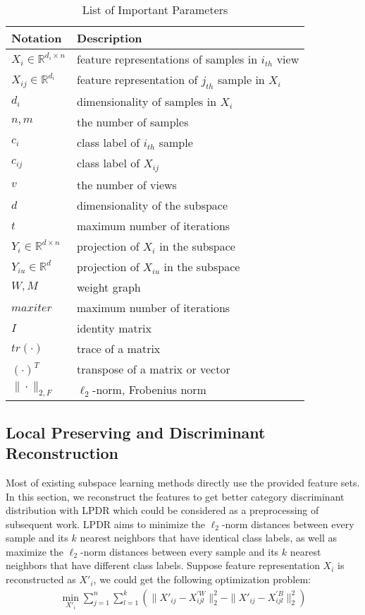 \documentclass[journal]{IEEEtran}
\begin{document}
\begin{table}[!t]
\centering
\caption{List of Important Parameters}
\begin{tabular}{p{2cm}p{6cm}}
\toprule
Notation & \hspace{1.7cm} Description \\
\midrule
$X_i\in \mathbb{R}^{{d_i}\times {n}}$ & feature representations of samples in $i_{th}$ view \\
$X_{ij}\in \mathbb{R}^{d_i}$ & feature representation of $j_{th}$ sample in $X_i$ \\
$d_i$ & dimensionality of samples in $X_i$ \\
$n,m$ & the number of samples \\
$c_i$ & class label of $i_{th}$ sample \\
$c_{ij}$ & class label of $X_{ij}$ \\
$v$ & the number of views \\
$d$ & dimensionality of the subspace \\

$t$ & maximum number of iterations \\
$Y_i\in \mathbb{R}^{d\times n}$ & projection of $X_i$ in the subspace \\
$Y_{iu}\in \mathbb{R}^{d}$ & projection of $X_{iu}$ in the subspace \\

$W, M$ & weight graph \\
$maxiter$ &  maximum number of iterations \\

$I$ & identity matrix \\
$tr(\cdot)$ & trace of a matrix \\
$(\cdot)^T$ & transpose of a matrix or vector \\
$\|\cdot \|_{2, F}$ & $\ell_2$-norm, Frobenius norm \\
\bottomrule
\end{tabular}
\label{notation}
\end{table}


\subsection{Local Preserving and Discriminant Reconstruction}
Most of existing subspace learning methods directly use the provided feature sets. 
In this section, we reconstruct the features to get better category discriminant distribution with LPDR which could be considered as a preprocessing of subsequent work. 
LPDR aims to minimize the $\ell_2$-norm distances between every sample and its $k$ nearest neighbors that have identical class labels, as well as maximize the $\ell_2$-norm distances between every sample and its $k$ nearest neighbors that have different class labels. 
Suppose feature representation $X_i$ is reconstructed as $X'_i$, we could get the following optimization problem:
\begin{gather}
\min_{X'_i} \sum_{j=1}^n \sum_{l=1}^k ( \|X'_{ij}-X_{ijl}^{'W} \|_2^2 - \|X'_{ij}-X_{ijl}^{'B} \|_2^2)
\end{gather}
\end{document}
